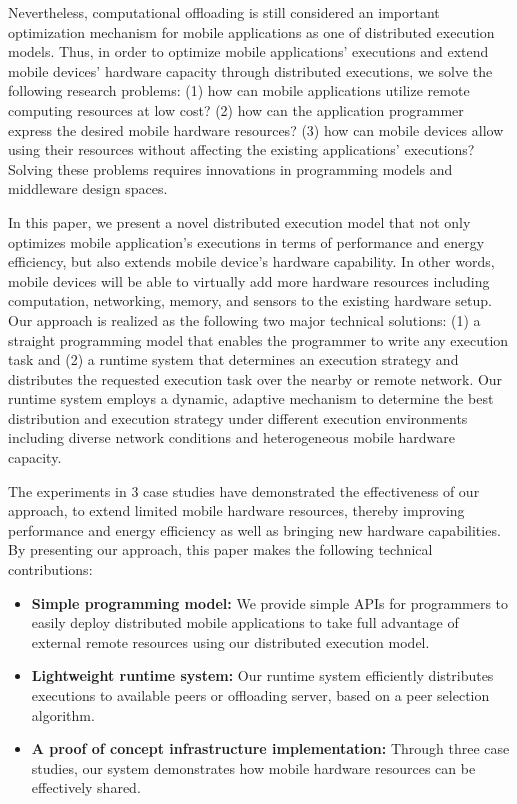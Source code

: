 \documentclass{sig-alternate}[10pt]
\begin{document}
\begin{CCSXML}
Nevertheless, computational offloading is still considered an important optimization mechanism for mobile applications as one of distributed execution models. Thus, in order to optimize mobile applications' executions and extend mobile devices' hardware capacity through distributed executions, we solve the following research problems: (1) how can mobile applications utilize remote computing resources at low cost? (2) how can the application programmer express the desired mobile hardware resources? (3) how can mobile devices allow using their resources without affecting the existing applications' executions? Solving these problems requires innovations in programming models and middleware design spaces. 

In this paper, we present a novel distributed execution model that not only optimizes mobile application's executions in terms of performance and energy efficiency, but also extends mobile device's hardware capability. In other words, mobile devices will be able to virtually add more hardware resources including computation, networking, memory, and sensors to the existing hardware setup. Our approach is realized as the following two major technical solutions: (1) a straight programming model that enables the programmer to write any execution task and (2) a runtime system that determines an execution strategy and distributes the requested execution task over the nearby or remote network. Our runtime system employs a dynamic, adaptive mechanism to determine the best distribution and execution strategy under different execution environments including diverse network conditions and heterogeneous mobile hardware capacity.

The experiments in 3 case studies have demonstrated the effectiveness of our approach, to extend limited mobile hardware resources, thereby improving performance and energy efficiency as well as bringing new hardware capabilities. By presenting our approach, this paper makes the following technical contributions:
\begin{itemize}
	\item \textbf{Simple programming model:} We provide simple APIs for programmers to easily deploy distributed mobile applications to take full advantage of external remote resources using our distributed execution model.
	\item \textbf{Lightweight runtime system:} Our runtime system efficiently distributes executions to available peers or offloading server, based on a peer selection algorithm. 	
	\item \textbf{A proof of concept infrastructure implementation:} Through three case studies, our system demonstrates how mobile hardware resources can be effectively shared.
\end{itemize}


\end{CCSXML}
\end{document}
